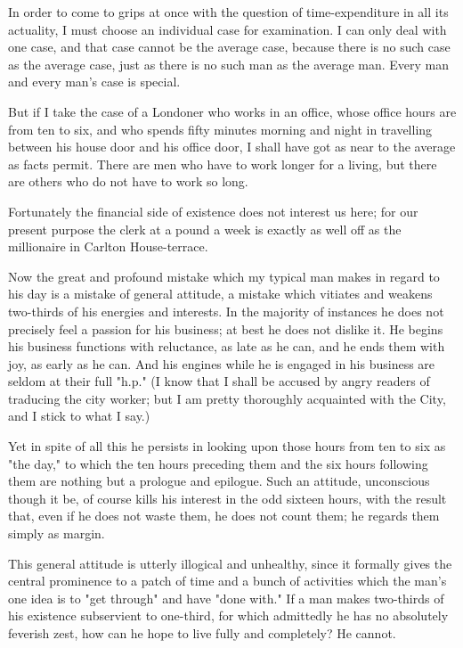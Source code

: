 In order to come to grips at once with the question of time-expenditure
in all its actuality, I must choose an individual case for examination.
I can only deal with one case, and that case cannot be the average
case, because there is no such case as the average case, just as there
is no such man as the average man. Every man and every man's case is
special.

But if I take the case of a Londoner who works in an office, whose
office hours are from ten to six, and who spends fifty minutes morning
and night in travelling between his house door and his office door, I
shall have got as near to the average as facts permit.  There are men
who have to work longer for a living, but there are others who do not
have to work so long.

Fortunately the financial side of existence does not interest us here;
for our present purpose the clerk at a pound a week is exactly as well
off as the millionaire in Carlton House-terrace.

Now the great and profound mistake which my typical man makes in regard
to his day is a mistake of general attitude, a mistake which vitiates
and weakens two-thirds of his energies and interests.  In the majority
of instances he does not precisely feel a passion for his business; at
best he does not dislike it.  He begins his business functions with
reluctance, as late as he can, and he ends them with joy, as early as
he can.  And his engines while he is engaged in his business are seldom
at their full "h.p."  (I know that I shall be accused by angry readers
of traducing the city worker; but I am pretty thoroughly acquainted
with the City, and I stick to what I say.)

Yet in spite of all this he persists in looking upon those hours from
ten to six as "the day," to which the ten hours preceding them and the
six hours following them are nothing but a prologue and epilogue.  Such
an attitude, unconscious though it be, of course kills his interest in
the odd sixteen hours, with the result that, even if he does not waste
them, he does not count them; he regards them simply as margin.

This general attitude is utterly illogical and unhealthy, since it
formally gives the central prominence to a patch of time and a bunch of
activities which the man's one idea is to "get through" and have "done
with."  If a man makes two-thirds of his existence subservient to
one-third, for which admittedly he has no absolutely feverish zest, how
can he hope to live fully and completely?  He cannot.

